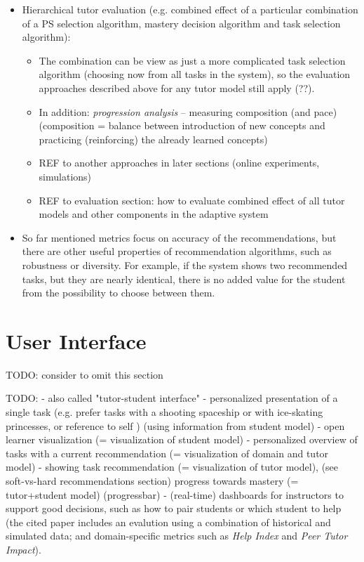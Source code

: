 \begin{itemize}
\item Hierarchical tutor evaluation (e.g. combined effect of a particular combination
  of a PS selection algorithm, mastery decision algorithm and task selection algorithm):
\begin{itemize}
\item The combination can be view as just a more complicated task selection algorithm
  (choosing now from all tasks in the system), so the evaluation approaches described
  above for any tutor model still apply (??).
\item In addition: \emph{progression analysis} -- measuring composition (and pace)
  (composition = balance between introduction of new concepts and practicing (reinforcing) the already learned concepts) \cite{progression-analysis}
\item REF to another approaches in later sections (online experiments, simulations)
\item REF to evaluation section: how to evaluate combined effect of all tutor
  models and other components in the adaptive system
\end{itemize}

\item %
So far mentioned metrics focus on accuracy of the recommendations,
but there are other useful properties of recommendation algorithms,
such as robustness or diversity.
For example, if the system shows two recommended tasks,
but they are nearly identical, there is no added value
for the student from the possibility to choose between them.
\end{itemize}



\section{User Interface}

TODO: consider to omit this section

TODO:
- also called "tutor-student interface"
- personalized presentation of a single task
(e.g. prefer tasks with a shooting spaceship or with ice-skating princesses,
or reference to self \cite[chapter 9]{its-domain-models})
(using information from student model)
- open learner visualization (= visualization of student model)
- personalized overview of tasks with a current recommendation (= visualization
of domain and tutor model)
- showing task recommendation (= visualization of tutor model),
  (see soft-vs-hard recommendations section)
  progress towards mastery (= tutor+student model)
  (progressbar)
- (real-time) dashboards for instructors to support good decisions,
  such as how to pair students or which student to help \cite{instructor-dashboard-realtime}
  (the cited paper includes an evalution using a combination of historical and simulated data;
  and domain-specific metrics such as \emph{Help Index} and \emph{Peer Tutor Impact}).

